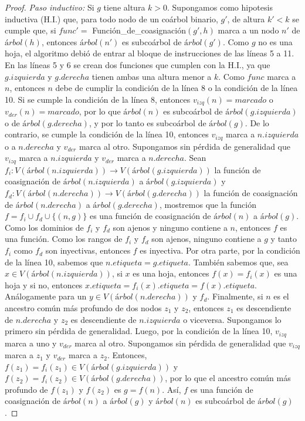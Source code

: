 \begin{proof}
    \emph{Paso inductivo:} Si $g$ tiene altura $k > 0$. Supongamos como hipotesis inductiva (H.I.) que, para todo nodo de un coárbol binario, $g'$, de altura $k' < k$ se cumple que, si $func' = $ Función\_de\_coasignación$(g',h)$ marca a un nodo $n'$ de $árbol(h)$, entonces $árbol(n')$ es subcoárbol de $árbol(g')$. Como $g$ no es una hoja, el algoritmo debió de entrar al bloque de instrucciones de las líneas 5 a 11. En las líneas 5 y 6 se crean dos funciones que cumplen con la H.I., ya que $g.izquierda$ y $g.derecha$ tienen ambas una altura menor a $k$. Como $func$ marca a $n$, entonces $n$ debe de cumplir la condición de la línea 8 o la condición de la línea 10. Si se cumple la condición de la línea 8, entonces $v_{izq}(n) = marcado$ o $v_{der}(n) = marcado$, por lo que $árbol(n)$ es subcoárbol de $árbol(g.izquierda)$ o de $árbol(g.derecha)$, y por lo tanto es subcoárbol de $árbol(g)$. De lo contrario, se cumple la condición de la línea 10, entonces $v_{izq}$ marca a $n.izquierda$ o a $n.derecha$ y $v_{der}$ marca al otro. Supongamos sin pérdida de generalidad que $v_{izq}$ marca a $n.izquierda$ y $v_{der}$ marca a $n.derecha$. Sean $f_i:V(árbol(n.izquierda))\rightarrow V(árbol(g.izquierda))$ la función de coasignación de $árbol(n.izquierda)$ a $árbol(g.izquierda)$ y $f_d:V(árbol(n.derecha))\rightarrow V(árbol(g.derecha))$ la función de coasignación de $árbol(n.derecha)$ a $árbol(g.derecha)$, mostremos que la función $f = f_i \cup f_d \cup \{(n,g)\}$ es una función de coasignación de $árbol(n)$ a $árbol(g)$. Como los dominios de $f_i$ y $f_d$ son ajenos y ninguno contiene a $n$, entonces $f$ es una función. Como los rangos de $f_i$ y $f_d$ son ajenos, ninguno contiene a $g$ y tanto $f_i$ como $f_d$ son inyectivas, entonces $f$ es inyectiva. Por otra parte, por la condición de la línea 10, sabemos que $n.etiqueta = g.etiqueta$. También sabemos que, sea $x \in V(árbol(n.izquierda))$, si $x$ es una hoja, entonces $f(x) = f_i(x)$ es una hoja y si no, entonces $x.etiqueta = f_i(x).etiqueta = f(x).etiqueta$. Análogamente para un $y \in V(árbol(n.derecha))$ y $f_d$. Finalmente, si $n$ es el ancestro común más profundo de dos nodos $z_1$ y $z_2$, entonces $z_1$ es descendiente de $n.derecha$ y $z_2$ es descendiente de $n.izquierda$ o viceversa. Supongamos lo primero sin pérdida de generalidad. Luego, por la condición de la línea 10, $v_{izq}$ marca a uno y $v_{der}$ marca al otro. Supongamos sin pérdida de generalidad que $v_{izq}$ marca a $z_1$ y $v_{der}$ marca a $z_2$. Entonces, $f(z_1) = f_i(z_1) \in V(árbol(g.izquierda))$ y $f(z_2) = f_i(z_2) \in V(árbol(g.derecha))$, por lo que el ancestro común más profundo de $f(z_1)$ y $f(z_2)$ es $g = f(n)$. Así, $f$ es una función de coasignación de $árbol(n)$ a $árbol(g)$ y $árbol(n)$ es subcoárbol de $árbol(g)$.


\end{proof}
